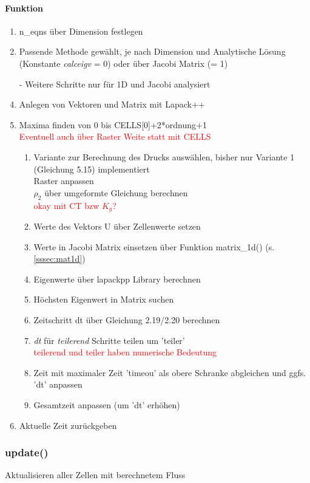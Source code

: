 \documentclass[12pt]{article}
\begin{document}
\paragraph{Funktion}
\renewcommand{\labelenumi}{\theenumi.} 
\begin{enumerate}
	\item n\_eqns über Dimension festlegen
	\item Passende Methode gewählt, je nach Dimension und Analytische Lösung (Konstante {\em calceigv} = 0) oder über Jacobi Matrix (= 1)
	\item[-] Weitere Schritte nur für 1D und Jacobi analysiert
	\item Anlegen von Vektoren und Matrix mit Lapack++
	\item Maxima finden von 0 bis CELLS[0]+2*ordnung+1\\
	\textcolor{red}{Eventuell auch über Raster Weite statt mit CELLS}
	\begin{enumerate}
		\item Variante zur Berechnung des Drucks auswählen, bisher nur Variante 1 (Gleichung 5.15) implementiert\\
		Raster anpassen\\
		$\rho_2$ über umgeformte Gleichung berechnen\\
		\textcolor{red}{okay mit CT bzw $K_g$?}
		\item Werte des Vektors U über Zellenwerte setzen
		\item Werte in Jacobi Matrix einsetzen über Funktion matrix\_1d() (s. \ref{sssec:mat1d})
		\item Eigenwerte über lapackpp Library berechnen
		\item Höchsten Eigenwert in Matrix suchen
		\item Zeitschritt dt über Gleichung 2.19/2.20 berechnen
		\item {\em dt} für {\em teilerend} Schritte teilen um 'teiler'\\
		\textcolor{red}{teilerend und teiler haben numerische Bedeutung}
		\item Zeit mit maximaler Zeit 'timeou' als obere Schranke abgleichen und ggfs. 'dt' anpassen
		\item Gesamtzeit anpassen (um 'dt' erhöhen)
	\end{enumerate}
	\item Aktuelle Zeit zurückgeben
\end{enumerate}

\subsubsection{update()} \label{sssec:upd}
Aktualisieren aller Zellen mit berechnetem Fluss
\renewcommand{\labelenumi}{\alph{enumi})} 
\end{document}
